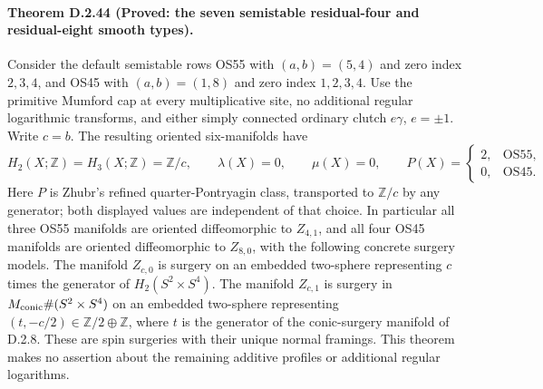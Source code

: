 \paragraph{Theorem D.2.44 (Proved: the seven semistable residual-four and residual-eight smooth types).}
Consider the default semistable rows OS55 with $(a,b)=(5,4)$ and zero
index $2,3,4$, and OS45 with $(a,b)=(1,8)$ and zero index $1,2,3,4$.
Use the primitive Mumford cap at every multiplicative site, no additional
regular logarithmic transforms, and either simply connected ordinary
clutch $e\gamma$, $e=\pm1$. Write $c=b$.
The resulting oriented six-manifolds have
\[
 H_2(X;\mathbb Z)=H_3(X;\mathbb Z)=\mathbb Z/c,
 \qquad \lambda(X)=0,\qquad \mu(X)=0,
 \qquad
 P(X)=\begin{cases}2,&\mathrm{OS55},\\0,&\mathrm{OS45}.
 \end{cases}                                                   \tag{D44.1}
\]
Here $P$ is Zhubr's refined quarter-Pontryagin class, transported to
$\mathbb Z/c$ by any generator; both displayed values are independent
of that choice. In particular all three OS55 manifolds are oriented
diffeomorphic to $Z_{4,1}$, and all four OS45 manifolds are oriented
diffeomorphic to $Z_{8,0}$, with the following concrete surgery models.
The manifold $Z_{c,0}$ is surgery on an embedded two-sphere representing
$c$ times the generator of $H_2(S^2\times S^4)$.
The manifold $Z_{c,1}$ is surgery in
$M_{\rm conic}\#(S^2\times S^4)$ on an embedded two-sphere representing
$(t,-c/2)\in\mathbb Z/2\oplus\mathbb Z$, where $t$ is the generator
of the conic-surgery manifold of D.2.8. These are spin surgeries with
their unique normal framings. This theorem makes no assertion about
the remaining additive profiles or additional regular logarithms.

